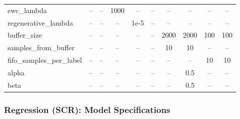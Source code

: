 \documentclass{article}
\begin{document}
\begin{table}[t]
\begin{tabular}{lccccccccc}
\midrule
ewc\_lambda         & --   & --    & 1000 & --  & --   & --   & --   & --   & --   \\
regenerative\_lambda& --   & --    & --   & 1e-5 & --  & --   & --   & --   & --   \\
\midrule
buffer\_size        & --   & --    & --   & --   & --   & 2000 & 2000 & 100  & 100  \\
samples\_from\_buffer & -- & --    & --   & --   & --   & 10   & 10   & --   & --   \\
fifo\_samples\_per\_label & -- & -- & --  & --   & --   & --   & --   & 10   & 10   \\
\midrule
alpha               & --   & --    & --   & --   & --   & --   & 0.5  & --   & --   \\
beta                & --   & --    & --   & --   & --   & --   & 0.5  & --   & --   \\
\bottomrule
\end{tabular}
\end{table}


\subsubsection{Regression (SCR): Model Specifications}
\label{sec:scr_model_specs}
\end{document}
